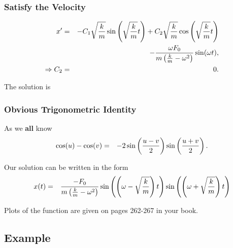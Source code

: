 \begin{frame}
  \frametitle{Satisfy the Velocity}

  \begin{eqnarray*}
    x' & = & - C_1 \sqrt{\frac{k}{m}} \sin\left(\sqrt{\frac{k}{m}}t\right) + C_2 \sqrt{\frac{k}{m}} \cos\left(\sqrt{\frac{k}{m}}t\right) \\ 
    & & - \frac{\omega F_0}{m\left(\frac{k}{m}-\omega^2\right)} \sin(\omega t), \\
    \Rightarrow C_2 & = & 0.
  \end{eqnarray*}

  {
    The solution is 
  }


\end{frame}


\begin{frame}
  \frametitle{Obvious Trigonometric Identity}

  As we \textbf{all} know
  \begin{eqnarray*}
    \cos(u) - \cos(v) & = & -2 \sin\left(\frac{u-v}{2}\right) \sin\left(\frac{u+v}{2}\right).
  \end{eqnarray*}

  Our solution can be written in the form
  \begin{eqnarray*}
    x(t) & = & \frac{-F_0}{m\left(\frac{k}{m}-\omega^2\right)} \sin\left(\left(\omega-\sqrt{\frac{k}{m}}\right) t\right)
                                                        \sin\left(\left(\omega+\sqrt{\frac{k}{m}}\right) t\right)
  \end{eqnarray*}

  Plots of the function are given on pages 262-267 in your book.

\end{frame}

\subsection{Example}

